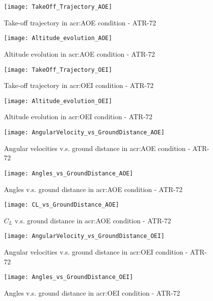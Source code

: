 %
\clearpage
%
%
%
\begin{figure}[H]
\centering
\texttt{[image: TakeOff\_Trajectory\_AOE]}
\caption{Take-off trajectory in \gls{acr:AOE} condition - ATR-72}
\end{figure}
%
\begin{figure}[H]
\centering
\texttt{[image: Altitude\_evolution\_AOE]}
\caption{Altitude evolution in \gls{acr:AOE} condition - ATR-72}
\end{figure}
%
\begin{figure}[H]
\centering
\texttt{[image: TakeOff\_Trajectory\_OEI]}
\caption{Take-off trajectory in \gls{acr:OEI} condition - ATR-72}
\end{figure}
%
\begin{figure}[H]
\centering
\texttt{[image: Altitude\_evolution\_OEI]}
\caption{Altitude evolution in \gls{acr:OEI} condition - ATR-72}
\end{figure}
%
\begin{figure}[H]
\centering
\texttt{[image: AngularVelocity\_vs\_GroundDistance\_AOE]}
\caption{Angular velocities v.s. ground distance in \gls{acr:AOE} condition - ATR-72}
\end{figure}
%
\begin{figure}[H]
\centering
\texttt{[image: Angles\_vs\_GroundDistance\_AOE]}
\caption{Angles v.s. ground distance in \gls{acr:AOE} condition - ATR-72}
\end{figure}
%
\begin{figure}[H]
\centering
\texttt{[image: CL\_vs\_GroundDistance\_AOE]}
\caption{$C_L$ v.s. ground distance in \gls{acr:AOE} condition - ATR-72}
\end{figure}
%
\begin{figure}[H]
\centering
\texttt{[image: AngularVelocity\_vs\_GroundDistance\_OEI]}
\caption{Angular velocities v.s. ground distance in \gls{acr:OEI} condition - ATR-72}
\end{figure}
%
\begin{figure}[H]
\centering
\texttt{[image: Angles\_vs\_GroundDistance\_OEI]}
\caption{Angles v.s. ground distance in \gls{acr:OEI} condition - ATR-72}
\end{figure}
